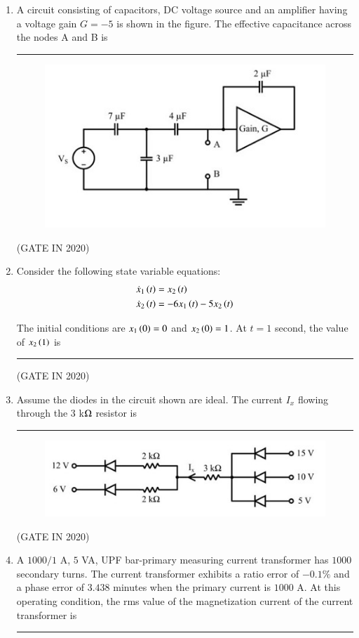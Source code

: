 \documentclass[journal,12pt,onecolumn]{IEEEtran}
\theoremstyle{remark}
\begin{document}
\begin{enumerate}
\item A circuit consisting of capacitors, DC voltage source and an amplifier having a voltage gain $G = -5$ is shown in the figure. The effective capacitance across the nodes A and B is \rule{2cm}{0.4pt} 
\begin{figure}[H]
\centering
\includegraphics[width=0.5\columnwidth]{figs/q23.jpg}
\caption*{}
\label{fig:q23}
\end{figure}

\hfill{(GATE IN 2020)}

\item Consider the following state variable equations:
\begin{align*}
\dot{x}_1\left(t\right) &= x_2\left(t\right) \\
\dot{x}_2\left(t\right) &= -6x_1\left(t\right) - 5x_2\left(t\right)
\end{align*}

The initial conditions are $x_1\left(0\right) = 0$ and $x_2\left(0\right) = 1$. At $t = 1$ second, the value of $x_2\left(1\right)$ is \rule{2cm}{0.4pt}  

\hfill{(GATE IN 2020)}

\item Assume the diodes in the circuit shown are ideal. The current $I_x$ flowing through the 3 k$\ohm$ resistor  is \rule{2cm}{0.4pt}
\begin{figure}[H]
\centering
\includegraphics[width=0.6\columnwidth]{figs/q24.jpg}
\caption*{}
\label{fig:q24}
\end{figure}

\hfill{(GATE IN 2020)}

\item A $1000/1$ A, $5$ VA, UPF bar-primary measuring current transformer has $1000$ secondary turns. The current transformer exhibits a ratio error of $-0.1\%$ and a phase error of $3.438$ minutes when the primary current is $1000$ A. At this operating condition, the rms value of the magnetization current of the current transformer  is \rule{2cm}{0.4pt}


\end{enumerate}
\end{document}
